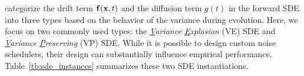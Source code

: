 \citet{song2020score} categorize the drift term ${\mathbf{f}}({\mathbf{x}}, t)$ and the diffusion term $g(t)$ in the forward SDE into three types based on the behavior of the variance during evolution. Here, we focus on two commonly used types: the \emph{\underline{V}ariance \underline{E}xplosion} (VE) SDE and \emph{\underline{V}ariance \underline{P}reserving} (VP) SDE. While it is possible to design custom noise schedulers, their design can substantially influence empirical performance. 
Table~\ref{tb:sde_instances} summarizes these two SDE instantiations.
\begin{table}[th]
  \caption{Summary of the forward SDEs}
  \small
  \centering
  \label{tb:sde_instances}
\end{table}




